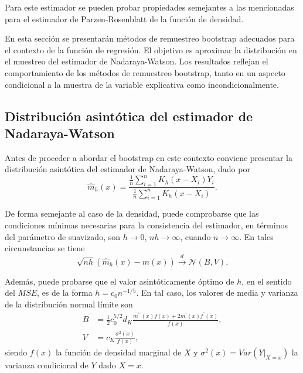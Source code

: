 \documentclass[
]{book}
\theoremstyle{break}
\theoremstyle{definition}
\theoremstyle{definition}
\theoremstyle{definition}
\theoremstyle{definition}
\theoremstyle{remark}
\begin{document}
Para este estimador se pueden probar propiedades semejantes a las
mencionadas para el estimador de Parzen-Rosenblatt de la función de
densidad.

En esta sección se presentarán métodos de remuestreo bootstrap adecuados
para el contexto de la función de regresión. El objetivo es aproximar la
distribución en el muestreo del estimador de Nadaraya-Watson. Los
resultados reflejan el comportamiento de los métodos de remuestreo
bootstrap, tanto en un aspecto condicional a la muestra de la variable
explicativa como incondicionalmente.

\hypertarget{distribuciuxf3n-asintuxf3tica-del-estimador-de-nadaraya-watson}{%
\subsection{Distribución asintótica del estimador de Nadaraya-Watson}\label{distribuciuxf3n-asintuxf3tica-del-estimador-de-nadaraya-watson}}

Antes de proceder a abordar el bootstrap en este contexto conviene
presentar la distribución asintótica del estimador de Nadaraya-Watson,
dado por
\[\hat{m}_{h}\left( x \right) =\frac{\frac{1}{n}\sum_{i=1}^{n}K_{h}\left(
x-X_i \right) Y_i}{\frac{1}{n}\sum_{i=1}^{n}K_{h}\left( x-X_i \right)}.\]

De forma semejante al caso de la densidad, puede comprobarse que las
condiciones mínimas necesarias para la consistencia del estimador, en
términos del parámetro de suavizado, son \(h\rightarrow 0\),
\(nh\rightarrow \infty\), cuando \(n\rightarrow \infty\). En tales
circunstancias se tiene
\[\sqrt{nh}\left( \hat{m}_{h}\left( x \right) -m\left( x \right) \right) \overset
{d}{\rightarrow }\mathcal{N}\left( B,V \right) \text{.}\]

Además, puede probarse que el valor asintóticamente óptimo de \(h\), en el
sentido del \(MSE\), es de la forma \(h=c_{0}n^{-1/5}\). En tal caso, los
valores de media y varianza de la distribución normal límite son
\[\begin{aligned}
B &= \frac{1}{2}c_{0}^{5/2}d_{K}\frac{m^{\prime \prime }\left( x \right)
f\left( x \right) +2m^{\prime}\left( x \right) f^{\prime}\left( x \right)}{
f\left( x \right)}, \\
V &= c_{K}\frac{\sigma^2\left( x \right)}{f\left( x \right)},
\end{aligned}\]
siendo \(f\left( x \right)\) la función de densidad marginal de \(X\) y
\(\sigma^2\left( x \right) =Var\left( \left. Y\right\vert _{X=x} \right)\)
la varianza condicional de \(Y\) dado \(X=x\).
\end{document}
